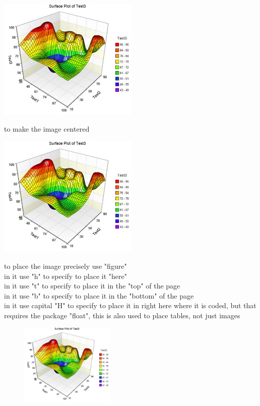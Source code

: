 \documentclass[10pt, a4paper]{article}
\begin{document}
\includegraphics[width=0.5\textwidth]{plot1}


to make the image centered\\
\begin{center}
\includegraphics[width=0.5\textwidth]{plot1}
\end{center}


to place the image precisely use "figure" \\
in it use "h" to specify to place it "here"\\
in it use "t" to specify to place it in the "top" of the page\\
in it use "b" to specify to place it in the "bottom" of the page\\
in it use capital "H" to specify to place it in right here where it is coded, but that requires the package "float", this is also used to place tables, not just images\\
\begin{figure}[h]
\includegraphics[width=0.4\textwidth]{plot1}
\end{figure}
\end{document}
